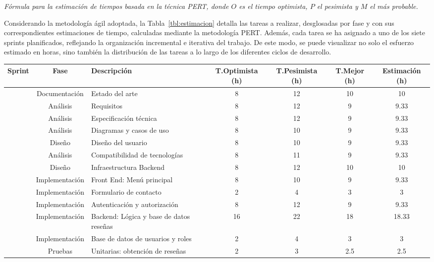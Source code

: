 \noindent
\textit{Fórmula para la estimación de tiempos basada en la técnica \gls{PERT}, donde $O$ es el tiempo optimista, $P$ el pesimista y $M$ el más probable.}

Considerando la metodología ágil adoptada, la Tabla~\ref{tbl:estimacion} detalla las tareas a realizar, desglosadas por fase y con sus correspondientes estimaciones de tiempo, calculadas mediante la metodología \gls{PERT}. Además, cada tarea se ha asignado a uno de los siete sprints planificados, reflejando la organización incremental e iterativa del trabajo. De este modo, se puede visualizar no solo el esfuerzo estimado en horas, sino también la distribución de las tareas a lo largo de los diferentes ciclos de desarrollo.
\begin{table}[h!tb]
    \centering
    \begin{adjustbox}{width=0.98\textwidth}
    \begin{scriptsize}
    \begin{tabular}{|c|c|L|c|c|c|c|}
    \hline
    \textbf{Sprint} & \textbf{Fase} & \textbf{Descripción} & \textbf{T.Optimista (h)} & \textbf{T.Pesimista (h)} & \textbf{T.Mejor (h)} & \textbf{Estimación (h)} \\
    \hline
     & Documentación & Estado del arte & 8 & 12 & 10 & 10 \\ 
    & Análisis & Requisitos & 8 & 12 & 9 & 9.33 \\ 
    & Análisis & Especificación técnica & 8 & 12 & 9 & 9.33 \\ 
    & Análisis & Diagramas y casos de uso & 8 & 10 & 9 & 9.33 \\ 
    & Diseño & Diseño del usuario & 8 & 10 & 9 & 9.33 \\ 
    & Análisis & Compatibilidad de tecnologías & 8 & 11 & 9 & 9.33 \\ 
    & Diseño & Infraestructura Backend & 8 & 12 & 10 & 10 \\ \hline

     & Implementación & Front End: Menú principal & 8 & 10 & 9 & 9.33 \\ 
    & Implementación & Formulario de contacto & 2 & 4 & 3 & 3 \\ 
    & Implementación & Autenticación y autorización & 8 & 12 & 9 & 9.33 \\ 
    & Implementación & Backend: Lógica y base de datos reseñas & 16 & 22 & 18 & 18.33 \\ 
    & Implementación & Base de datos de usuarios y roles & 2 & 4 & 3 & 3 \\ 
    & Pruebas & Unitarias: obtención de reseñas & 2 & 3 & 2.5 & 2.5 \\ \hline


\end{tabular}
\end{scriptsize}
\end{adjustbox}
\end{table}
